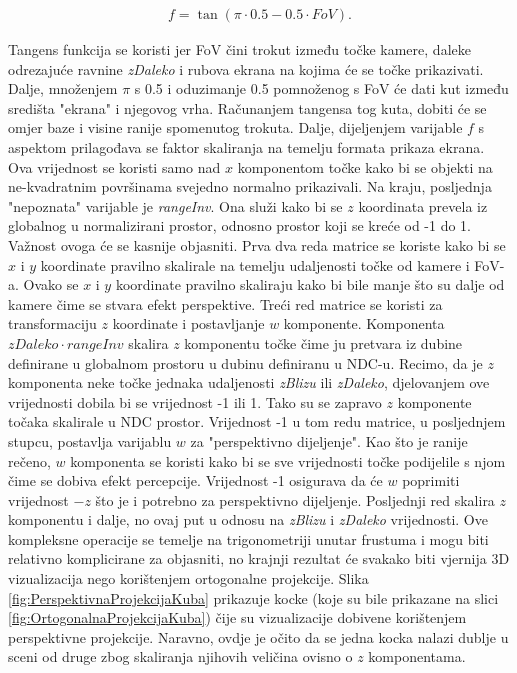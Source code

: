 \documentclass{foi}
\begin{document}
\begin{align*}
	f = \tan(\pi\cdot0.5 - 0.5\cdot FoV).
\end{align*}

Tangens funkcija se koristi jer FoV čini trokut između točke kamere, daleke odrezajuće ravnine \textit{zDaleko} i rubova ekrana na kojima će se točke prikazivati. Dalje, množenjem $\pi$ s 0.5 i oduzimanje 0.5 pomnoženog s FoV će dati kut između središta "ekrana" i njegovog vrha. Računanjem tangensa tog kuta, dobiti će se omjer baze i visine ranije spomenutog trokuta. Dalje, dijeljenjem varijable $f$ s aspektom prilagođava se faktor skaliranja na temelju formata prikaza ekrana. Ova vrijednost se koristi samo nad $x$ komponentom točke kako bi se objekti na ne-kvadratnim površinama svejedno normalno prikazivali. Na kraju, posljednja "nepoznata" varijable je \textit{rangeInv}. Ona služi kako bi se $z$ koordinata prevela iz globalnog u normalizirani prostor, odnosno prostor koji se kreće od -1 do 1. Važnost ovoga će se kasnije objasniti. Prva dva reda matrice se koriste kako bi se $x$ i $y$ koordinate pravilno skalirale na temelju udaljenosti točke od kamere i FoV-a. Ovako se $x$ i $y$ koordinate pravilno skaliraju kako bi bile manje što su dalje od kamere čime se stvara efekt perspektive. Treći red matrice se koristi za transformaciju $z$ koordinate i postavljanje $w$ komponente. Komponenta $zDaleko \cdot rangeInv$ skalira $z$ komponentu točke čime ju pretvara iz dubine definirane u globalnom prostoru u dubinu definiranu u NDC-u. Recimo, da je $z$ komponenta neke točke jednaka udaljenosti \textit{zBlizu} ili \textit{zDaleko}, djelovanjem ove vrijednosti dobila bi se vrijednost -1 ili 1. Tako su se zapravo $z$ komponente točaka skalirale u NDC prostor. Vrijednost -1 u tom redu matrice, u posljednjem stupcu, postavlja varijablu $w$ za "perspektivno dijeljenje". Kao što je ranije rečeno, $w$ komponenta se koristi kako bi se sve vrijednosti točke podijelile s njom čime se dobiva efekt percepcije. Vrijednost -1 osigurava da će $w$ poprimiti vrijednost $-z$ što je i potrebno za perspektivno dijeljenje. Posljednji red skalira $z$ komponentu i dalje, no ovaj put u odnosu na \textit{zBlizu} i \textit{zDaleko} vrijednosti. Ove kompleksne operacije se temelje na trigonometriji unutar frustuma i mogu biti relativno komplicirane za objasniti, no krajnji rezultat će svakako biti vjernija 3D vizualizacija nego korištenjem ortogonalne projekcije. Slika \ref{fig:PerspektivnaProjekcijaKuba} prikazuje kocke (koje su bile prikazane na slici \ref{fig:OrtogonalnaProjekcijaKuba}) čije su vizualizacije dobivene korištenjem perspektivne projekcije. Naravno, ovdje je očito da se jedna kocka nalazi dublje u sceni od druge zbog skaliranja njihovih veličina ovisno o $z$ komponentama.
\end{document}
